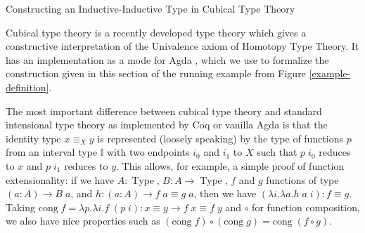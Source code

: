 \documentclass[runningheads]{llncs}
\DeclareMathOperator{\USet}{Type}
\newcommand{\Id}[2]{{#1}\equiv{#2}}
\newcommand{\IdA}[3]{{#1}\equiv_{#3}{#2}}
\newcommand{\II}{\mathbb{I}}
\begin{document}
\begin{section}{Constructing an Inductive-Inductive Type in Cubical Type Theory}\label{example-construct-cubical}

Cubical type theory \citep{cubicaltt_ifcolog} is a recently developed type theory which gives a constructive interpretation of the Univalence axiom of Homotopy Type Theory. It has an implementation as a mode for Agda \citep{AddingCubesToAgda}, which we use to formalize the construction given in this section of the running example from Figure \ref{example-definition}.

The most important difference between cubical type theory and standard intensional type theory as implemented by Coq or vanilla Agda is that the identity type $\IdA{x}{y}{X}$ is represented (loosely speaking) by the type of functions $p$ from an interval type $\II$ with two endpoints $i_0$ and $i_1$ to $X$ such that $p\;i_0$ reduces to $x$ and $p\;i_1$ reduces to $y$. This allows, for example, a simple proof of function extensionality: if we have $A : \USet$, $B : A\to \USet$, $f$ and $g$ functions of type $(a : A) \to B\;a$, and $h : (a : A) \to \Id{f\;a}{g\;a}$, then we have $(\lambda i.\lambda a.h\;a\;i) : \Id{f}{g}$. Taking $\text{cong}\; f = \lambda p. \lambda i. f\; (p\;i) : \Id{x}{y} \to \Id{f\;x}{f\;y}$ and $\circ$ for function composition, we also have nice properties such as $(\text{cong}\; f) \circ (\text{cong}\; g) = \text{cong}\; (f \circ g)$.


\end{section}
\end{document}
